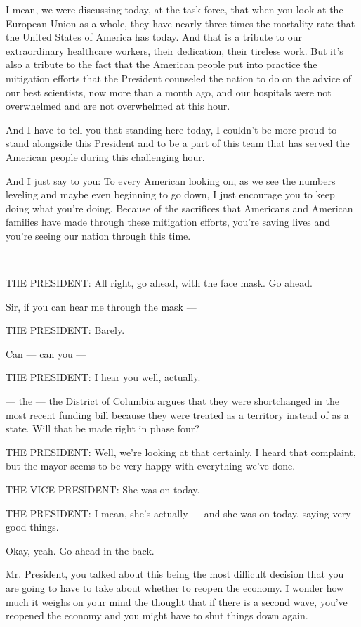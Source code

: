 I mean, we were discussing today, at the task force, that when you look
at the European Union as a whole, they have nearly three times the
mortality rate that the United States of America has today. And that is
a tribute to our extraordinary healthcare workers, their dedication,
their tireless work. But it's also a tribute to the fact that the
American people put into practice the mitigation efforts that the
President counseled the nation to do on the advice of our best
scientists, now more than a month ago, and our hospitals were not
overwhelmed and are not overwhelmed at this hour.

And I have to tell you that standing here today, I couldn't be more
proud to stand alongside this President and to be a part of this team
that has served the American people during this challenging hour.

And I just say to you: To every American looking on, as we see the
numbers leveling and maybe even beginning to go down, I just encourage
you to keep doing what you're doing. Because of the sacrifices that
Americans and American families have made through these mitigation
efforts, you're saving lives and you're seeing our nation through this
time.

-\/-

THE PRESIDENT: All right, go ahead, with the face mask. Go ahead.

Sir, if you can hear me through the mask ---

THE PRESIDENT: Barely.

Can --- can you ---

THE PRESIDENT: I hear you well, actually.

--- the --- the District of Columbia argues that they were shortchanged
in the most recent funding bill because they were treated as a territory
instead of as a state. Will that be made right in phase four?

THE PRESIDENT: Well, we're looking at that certainly. I heard that
complaint, but the mayor seems to be very happy with everything we've
done.

THE VICE PRESIDENT: She was on today.

THE PRESIDENT: I mean, she's actually --- and she was on today, saying
very good things.

Okay, yeah. Go ahead in the back.

Mr. President, you talked about this being the most difficult decision
that you are going to have to take about whether to reopen the economy.
I wonder how much it weighs on your mind the thought that if there is a
second wave, you've reopened the economy and you might have to shut
things down again.

